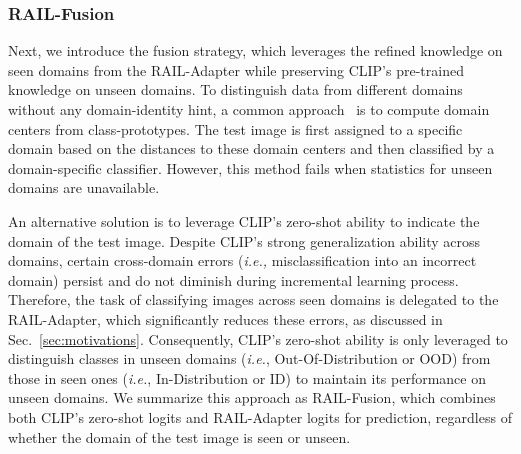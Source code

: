 \documentclass{article}
\begin{document}
\subsubsection{RAIL-Fusion}
\label{sec:fusion}
Next, we introduce the fusion strategy, which leverages the refined knowledge on seen domains from the RAIL-Adapter while preserving CLIP's pre-trained knowledge on unseen domains. To distinguish data from different domains without any domain-identity hint, a common approach~\cite{wang2022s} is to compute domain centers from class-prototypes. The test image is first assigned to a specific domain based on the distances to these domain centers and then classified by a domain-specific classifier. However, this method fails when statistics for unseen domains are unavailable.

An alternative solution is to leverage CLIP's zero-shot ability to indicate the domain of the test image. Despite CLIP's strong generalization ability across domains, certain cross-domain errors (\textit{i.e.,} misclassification into an incorrect domain) persist and do not diminish during incremental learning process. Therefore, the task of classifying images across seen domains is delegated to the RAIL-Adapter, which significantly reduces these errors, as discussed in Sec.~\ref{sec:motivations}. Consequently, CLIP's zero-shot ability is only leveraged to distinguish classes in unseen domains (\textit{i.e.}, Out-Of-Distribution or OOD) from those in seen ones (\textit{i.e.}, In-Distribution or ID) to maintain its performance on unseen domains. We summarize this approach as RAIL-Fusion, which combines both CLIP's zero-shot logits and RAIL-Adapter logits for prediction, regardless of whether the domain of the test image is seen or unseen.
\end{document}
